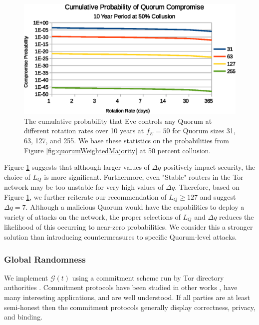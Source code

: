 \documentclass[conference]{IEEEtran}
\begin{document}
\begin{figure}[h]
	\centering
	\includegraphics[width=\linewidth]{../assets/analysis/CumulativeMaliciousQuorumNew.eps}
	\caption{The cumulative probability that Eve controls any Quorum at different rotation rates over 10 years at $ f_{E} = 50 $ for Quorum sizes 31, 63, 127, and 255. We base these statistics on the probabilities from Figure \ref{fig:quorumWeightedMajority} at 50 percent collusion.}
	\label{fig:cumulativeProbability}
\end{figure}

Figure \ref{fig:cumulativeProbability} suggests that although larger values of $ \Delta q $ positively impact security, the choice of $ L_{Q} $ is more significant. Furthermore, even "Stable" routers in the Tor network may be too unstable for very high values of $ \Delta q $. Therefore, based on Figure \ref{fig:cumulativeProbability}, we further reiterate our recommendation of $ L_{Q} \geq 127 $ and suggest $ \Delta q = 7 $. Although a malicious Quorum would have the capabilities to deploy a variety of attacks on the network, the proper selections of $ L_{Q} $ and $ \Delta q $ reduces the likelihood of this occurring to near-zero probabilities. We consider this a stronger solution than introducing countermeasures to specific Quorum-level attacks.

\subsubsection{Global Randomness}
\label{sec:RandGeneration}

We implement $ \mathcal{G}(t) $ using a commitment scheme run by Tor directory authorities \cite{GouletCommitReveal}. Commitment protocols have been studied in other works \cite{rivest1999unconditionally}\cite{naor1990bit}, have many interesting applications, and are well understood. If all parties are at least semi-honest then the commitment protocols generally display correctness, privacy, and binding. 
\end{document}
